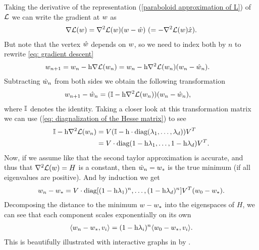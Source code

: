 Taking the derivative of the representation (\ref{paraboloid approximation of
L}) of \(\mathcal{L}\) we can write the gradient at \(w\) as
%
\begin{align}\label{eq: hesse representation of gradient}
	\nabla \mathcal{L}(w)
	=  \nabla^2 \mathcal{L}(w)(w-\hat{w})
	\ (= -\nabla^2 \mathcal{L}(w)\hat{x}).
\end{align}
%
But note that the vertex \(\hat{w}\) depends on \(w\), so we need
to index both by \(n\) to rewrite \ref{eq: gradient descent}
%
\begin{align*}
	w_{n+1} &= w_n - \text{h}\nabla \mathcal{L}(w_n)
	= w_n - \text{h}\nabla^2 \mathcal{L}(w_n)(w_n - \hat{w}_n).
\end{align*}
%
Subtracting \(\hat{w}_n\) from both sides we obtain the following
transformation 
%
\begin{align}\label{eq: Matrix GD Formulation}
	w_{n+1} - \hat{w}_n
	&= (\mathbb{I} - \text{h}\nabla^2 \mathcal{L}(w_n) ) (w_n - \hat{w}_n),
\end{align}
where \(\mathbb{I}\) denotes the identity.
Taking a closer look at this transformation matrix we can use (\ref{eq:
diagnalization of the Hesse matrix}) to see
%
\begin{align*}
	\mathbb{I} - \text{h}\nabla^2 \mathcal{L}(w_n)
	&= V(\mathbb{I} - \text{h}\cdot\text{diag}(\lambda_1,\dots,\lambda_d) )V^T \\
	&= V\cdot\text{diag}(1-\text{h}\lambda_1, \dots,1-\text{h}\lambda_d)V^T.
\end{align*}
%
Now, if we assume like \textcite{gohWhyMomentumReally2017} that the second
taylor approximation is accurate, and thus that \(\nabla^2 \mathcal{L}(w)=H\) is a
constant, then \(\hat{w}_n = w_*\) is the true minimum (if all
eigenvalues are positive). And by induction we get
%
\begin{align}
	w_n - w_*
	= V\cdot\text{diag}[(1-\text{h}\lambda_1)^n,\dots,(1-\text{h}\lambda_d)^n] V^T (w_0 - w_*).
\end{align}
%
Decomposing the distance to the minimum \(w - w_*\) into the
eigenspaces of \(H\), we can see that each component scales exponentially on its
own 
%
\begin{align*}
	\langle w_n -w_*, v_i\rangle
	= (1-\text{h}\lambda_i)^n \langle w_0 - w_*, v_i\rangle.
\end{align*}
%
This is beautifully illustrated with interactive graphs in
 by \citeauthor{gohWhyMomentumReally2017}.

